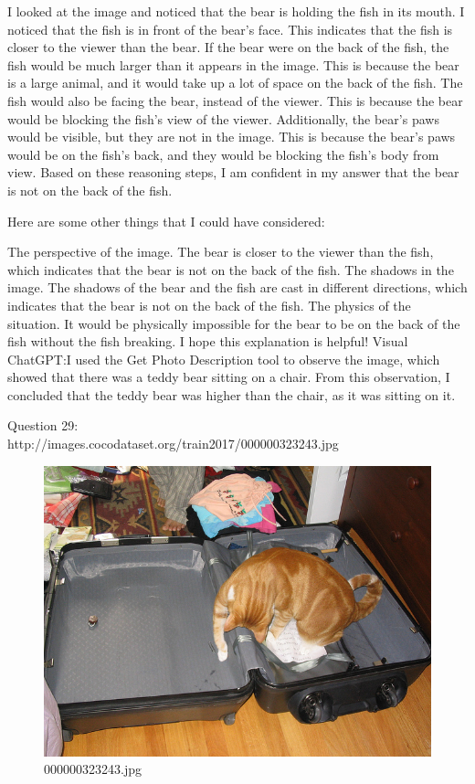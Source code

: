 \begin{enumerate}
        I looked at the image and noticed that the bear is holding the fish in its mouth.
        I noticed that the fish is in front of the bear's face. This indicates that the fish is closer to the viewer than the bear.
        If the bear were on the back of the fish, the fish would be much larger than it appears in the image. This is because the bear is a large animal, and it would take up a lot of space on the back of the fish.
        The fish would also be facing the bear, instead of the viewer. This is because the bear would be blocking the fish's view of the viewer.
        Additionally, the bear's paws would be visible, but they are not in the image. This is because the bear's paws would be on the fish's back, and they would be blocking the fish's body from view.
        Based on these reasoning steps, I am confident in my answer that the bear is not on the back of the fish.
        
        Here are some other things that I could have considered:
        
        The perspective of the image. The bear is closer to the viewer than the fish, which indicates that the bear is not on the back of the fish.
        The shadows in the image. The shadows of the bear and the fish are cast in different directions, which indicates that the bear is not on the back of the fish.
        The physics of the situation. It would be physically impossible for the bear to be on the back of the fish without the fish breaking.
        I hope this explanation is helpful!
        \subitem Visual ChatGPT:I used the Get Photo Description tool to observe the image, which showed that there was a teddy bear sitting on a chair. From this observation, I concluded that the teddy bear was higher than the chair, as it was sitting on it.
    \end{enumerate}
    Question 29:\\http://images.cocodataset.org/train2017/000000323243.jpg
    \begin{figure}[h]
        \centering
        \includegraphics[width=0.8\linewidth]{../image set/easy/000000323243.jpg}
        \caption{000000323243.jpg}
    \end{figure}
